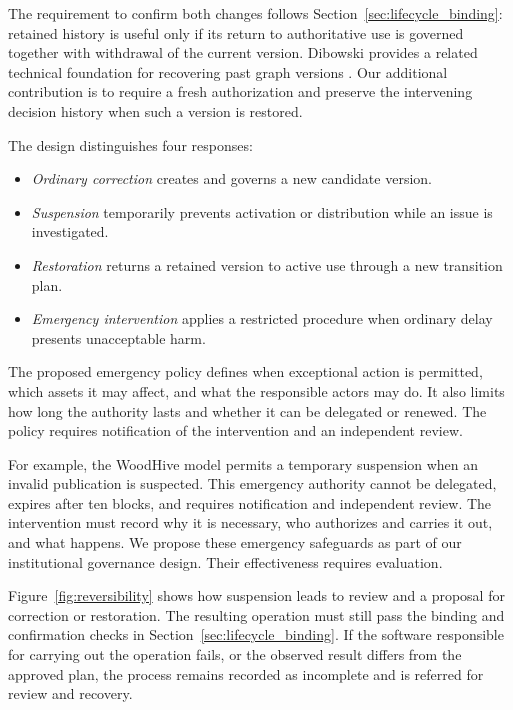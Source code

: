 \documentclass[journal]{IEEEtran}
\begin{document}
The requirement to confirm both changes follows
Section~\ref{sec:lifecycle_binding}: retained history is useful only
if its return to authoritative use is governed together with withdrawal
of the current version. Dibowski provides a related technical foundation
for recovering past graph versions \cite{Dibowski2024TraceabilityKG}.
Our additional contribution is to require a fresh authorization and
preserve the intervening decision history when such a version is restored.

The design distinguishes four responses:
\begin{itemize}
    \item \emph{Ordinary correction} creates and governs
    a new candidate version.

    \item \emph{Suspension} temporarily prevents activation
    or distribution while an issue is investigated.

    \item \emph{Restoration} returns a retained version
    to active use through a new transition plan.

    \item \emph{Emergency intervention} applies a restricted
    procedure when ordinary delay presents unacceptable harm.
\end{itemize}

The proposed emergency policy defines when exceptional
action is permitted, which assets it may affect, and what
the responsible actors may do. It also limits how long
the authority lasts and whether it can be delegated or
renewed. The policy requires notification of the intervention
and an independent review.

For example, the WoodHive model permits a temporary
suspension when an invalid publication is suspected.
This emergency authority cannot be delegated, expires
after ten blocks, and requires notification and independent
review. The intervention must record why it is necessary,
who authorizes and carries it out, and what happens.
We propose these emergency safeguards as part of our
institutional governance design. Their effectiveness
requires evaluation.

Figure~\ref{fig:reversibility} shows how suspension leads
to review and a proposal for correction or restoration.
The resulting operation must still pass the binding and
confirmation checks in Section~\ref{sec:lifecycle_binding}.
If the software responsible for carrying out the operation
fails, or the observed result differs from the approved
plan, the process remains recorded as incomplete and is
referred for review and recovery.
\end{document}

